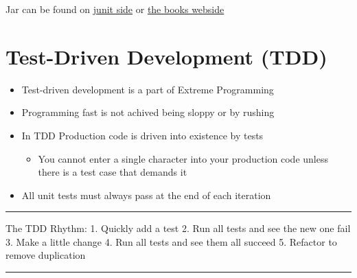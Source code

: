 \documentclass[11pt]{article}
\providecommand{\tightlist}{%
      \setlength{\itemsep}{0pt}\setlength{\parskip}{0pt}}
\begin{document}
Jar can be found on \href{www.junit.org}{junit side} or
\href{www.baerbak.com}{the books webside}

    \hypertarget{test-driven-development-tdd}{%
\section{Test-Driven Development
(TDD)}\label{test-driven-development-tdd}}

\begin{itemize}
\item
  Test-driven development is a part of Extreme Programming
\item
  Programming fast is not achived being sloppy or by rushing
\item
  In TDD Production code is driven into existence by tests

  \begin{itemize}
  \tightlist
  \item
    You cannot enter a single character into your production code unless
    there is a test case that demands it
  \end{itemize}
\item
  All unit tests must always pass at the end of each iteration
\end{itemize}

\begin{center}\rule{0.5\linewidth}{\linethickness}\end{center}

The TDD Rhythm: 1. Quickly add a test 2. Run all tests and see the new
one fail 3. Make a little change 4. Run all tests and see them all
succeed 5. Refactor to remove duplication

\begin{center}\rule{0.5\linewidth}{\linethickness}\end{center}
\end{document}

